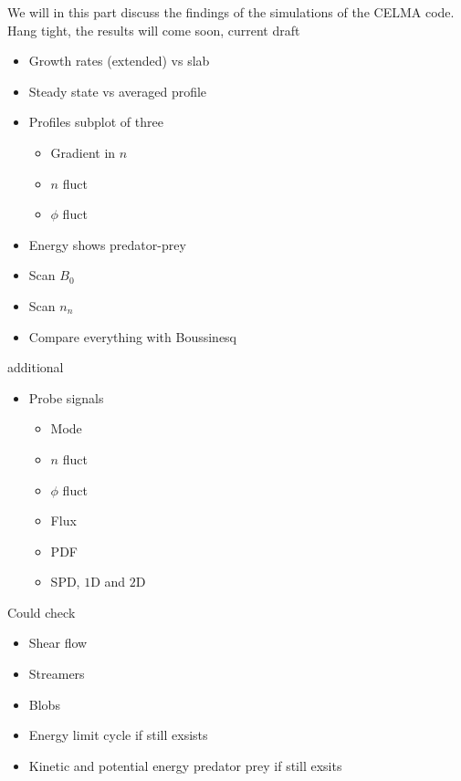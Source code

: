We will in this part discuss the findings of the simulations of the CELMA code.
Hang tight, the results will come soon, current draft
%
\begin{itemize}[noitemsep]
    \item Growth rates (extended) vs slab
    \item Steady state vs averaged profile
    \item Profiles subplot of three
    \begin{itemize}[noitemsep]
        \item Gradient in $n$
        \item $n$ fluct
        \item $\phi$ fluct
    \end{itemize}
    \item Energy shows predator-prey
    \item Scan $B_0$
    \item Scan $n_n$
    \item Compare everything with Boussinesq
\end{itemize}
%
additional
%
\begin{itemize}[noitemsep]
    \item Probe signals
    \begin{itemize}[noitemsep]
        \item Mode
        \item $n$ fluct
        \item $\phi$ fluct
        \item Flux
        \item PDF
        \item SPD, $1$D and $2$D
    \end{itemize}
\end{itemize}
%
Could check
%
\begin{itemize}[noitemsep]
    \item Shear flow
    \item Streamers
    \item Blobs
    \item Energy limit cycle if still exsists
    \item Kinetic and potential energy predator prey if still exsits
\end{itemize}
%
